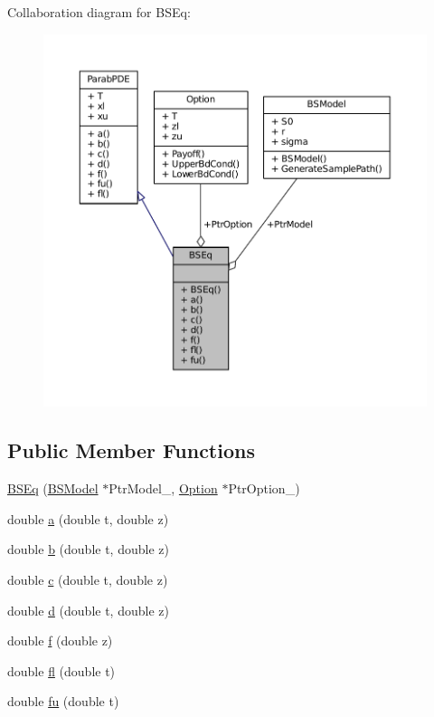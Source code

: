 Collaboration diagram for B\+S\+Eq\+:\nopagebreak
\begin{figure}[H]
\begin{center}
\leavevmode
\includegraphics[width=350pt]{classBSEq__coll__graph}
\end{center}
\end{figure}
\subsection*{Public Member Functions}
\begin{DoxyCompactItemize}
\item 
\hyperlink{classBSEq_a3545b5fe078c573514666f07e3d516b2}{B\+S\+Eq} (\hyperlink{classBSModel}{B\+S\+Model} $\ast$Ptr\+Model\+\_\+, \hyperlink{classOption}{Option} $\ast$Ptr\+Option\+\_\+)
\item 
double \hyperlink{classBSEq_aac9b72618a86b764022bc2f8a0623b0c}{a} (double t, double z)
\item 
double \hyperlink{classBSEq_a7b0a00c216ae383f5a768c8efd42e672}{b} (double t, double z)
\item 
double \hyperlink{classBSEq_aa63fc29fedf4ef53ace9499fab4d7aba}{c} (double t, double z)
\item 
double \hyperlink{classBSEq_ae01526739bc51e813dfdb880585aefc0}{d} (double t, double z)
\item 
double \hyperlink{classBSEq_a6c81cef2ec102bc86bc8ff6378a2a519}{f} (double z)
\item 
double \hyperlink{classBSEq_a5bde9ad3db5d94df77c78929de7f2717}{fl} (double t)
\item 
double \hyperlink{classBSEq_acebc22c41d04659861ef346d988de565}{fu} (double t)
\end{DoxyCompactItemize}
